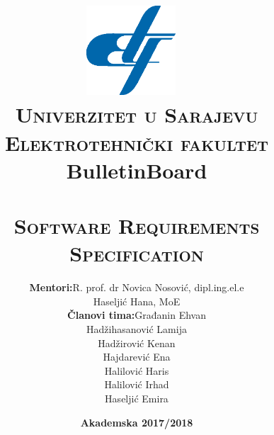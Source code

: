 \documentclass{article}
\title{
{
    \includegraphics[width=0.25\textwidth]{SRS/slike/logo.png}~\\[0.1cm]
    \textsc{\Large Univerzitet u Sarajevu}\\[0.2cm]  
    \textsc{\Large Elektrotehnički fakultet} \\[0.5cm] 
    \huge \bfseries BulletinBoard} \\[0.4cm] 
    \breakline \\[0.5cm]
    \textsc{\Large Software Requirements Specification}\\[0.4cm]
    }
\author{\begin{tabular}{rl}
  \textbf{Mentori:} & R. prof. dr Novica Nosović, dipl.ing.el.e \\ &
                    Haseljić Hana, MoE \\
  \textbf{Članovi tima:} & Građanin Ehvan \\ 
                        & Hadžihasanović Lamija \\ 
                        & Hadžirović Kenan \\ 
                        & Hajdarević Ena \\ 
                        & Halilović Haris \\ 
                        & Halilović Irhad \\ 
                        & Haseljić Emira
\end{tabular}}
\date{\textbf{Akademska 2017/2018}}
\begin{document}
\maketitle
\newpage
\renewcommand{\contentsname}{Sadržaj}
\tableofcontents
\newpage


\newpage

\newpage

\newpage

\newpage


\newpage

\end{document}
